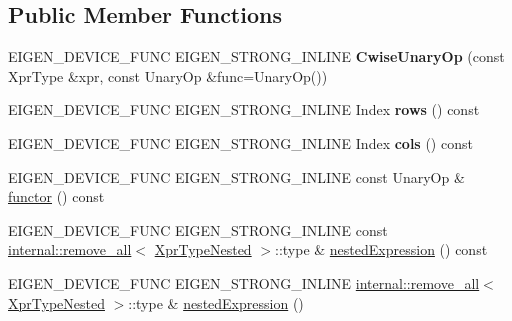 \subsection*{Public Member Functions}
\begin{DoxyCompactItemize}
\item 
\mbox{\label{class_eigen_1_1_cwise_unary_op_aa8cd371792c4707e30a39e20f7adde0d}} 
E\+I\+G\+E\+N\+\_\+\+D\+E\+V\+I\+C\+E\+\_\+\+F\+U\+NC E\+I\+G\+E\+N\+\_\+\+S\+T\+R\+O\+N\+G\+\_\+\+I\+N\+L\+I\+NE {\bfseries Cwise\+Unary\+Op} (const Xpr\+Type \&xpr, const Unary\+Op \&func=Unary\+Op())
\item 
\mbox{\label{class_eigen_1_1_cwise_unary_op_a0aef7d6eb6d0214df219b7980ecf41de}} 
E\+I\+G\+E\+N\+\_\+\+D\+E\+V\+I\+C\+E\+\_\+\+F\+U\+NC E\+I\+G\+E\+N\+\_\+\+S\+T\+R\+O\+N\+G\+\_\+\+I\+N\+L\+I\+NE Index {\bfseries rows} () const
\item 
\mbox{\label{class_eigen_1_1_cwise_unary_op_a61d9838a84e9276328f59f0f4449b99a}} 
E\+I\+G\+E\+N\+\_\+\+D\+E\+V\+I\+C\+E\+\_\+\+F\+U\+NC E\+I\+G\+E\+N\+\_\+\+S\+T\+R\+O\+N\+G\+\_\+\+I\+N\+L\+I\+NE Index {\bfseries cols} () const
\item 
E\+I\+G\+E\+N\+\_\+\+D\+E\+V\+I\+C\+E\+\_\+\+F\+U\+NC E\+I\+G\+E\+N\+\_\+\+S\+T\+R\+O\+N\+G\+\_\+\+I\+N\+L\+I\+NE const Unary\+Op \& \mbox{\hyperlink{class_eigen_1_1_cwise_unary_op_ac02eff03893317021760f7d093c4ab9d}{functor}} () const
\item 
E\+I\+G\+E\+N\+\_\+\+D\+E\+V\+I\+C\+E\+\_\+\+F\+U\+NC E\+I\+G\+E\+N\+\_\+\+S\+T\+R\+O\+N\+G\+\_\+\+I\+N\+L\+I\+NE const \mbox{\hyperlink{struct_eigen_1_1internal_1_1remove__all}{internal\+::remove\+\_\+all}}$<$ \mbox{\hyperlink{struct_eigen_1_1internal_1_1true__type}{Xpr\+Type\+Nested}} $>$\+::type \& \mbox{\hyperlink{class_eigen_1_1_cwise_unary_op_a25d4402be360cf0b8ff867863da46c7d}{nested\+Expression}} () const
\item 
E\+I\+G\+E\+N\+\_\+\+D\+E\+V\+I\+C\+E\+\_\+\+F\+U\+NC E\+I\+G\+E\+N\+\_\+\+S\+T\+R\+O\+N\+G\+\_\+\+I\+N\+L\+I\+NE \mbox{\hyperlink{struct_eigen_1_1internal_1_1remove__all}{internal\+::remove\+\_\+all}}$<$ \mbox{\hyperlink{struct_eigen_1_1internal_1_1true__type}{Xpr\+Type\+Nested}} $>$\+::type \& \mbox{\hyperlink{class_eigen_1_1_cwise_unary_op_a2efe6055ea94b65c29dcf1cdcbd7e17e}{nested\+Expression}} ()
\end{DoxyCompactItemize}
